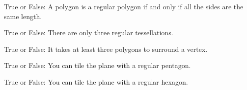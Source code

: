 \documentclass[nooutcomes,noauthor]{ximera}
\author{Bart Snapp}
\begin{document}
\maketitle




\begin{exercise}
  True or False: A polygon is a regular polygon if and only if all the
  sides are the same length. 
\end{exercise}




\begin{exercise} True or False:
  There are only three regular tessellations.
\end{exercise}


\begin{exercise} True or False:
  It takes at least three polygons to surround a vertex.
\end{exercise}


\begin{exercise} True or False:
  You can tile the plane with a regular pentagon.
\end{exercise}



\begin{exercise} True or False:
  You can tile the plane with a regular hexagon.
\end{exercise}






\end{document}
